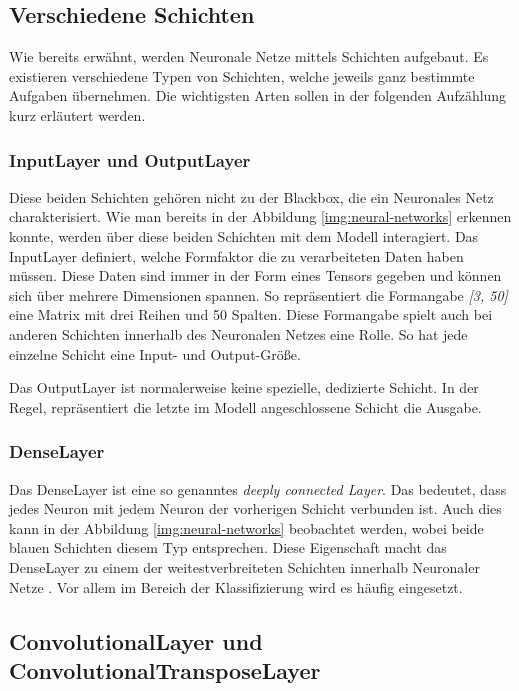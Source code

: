 \subsection{Verschiedene Schichten}
Wie bereits erwähnt, werden Neuronale Netze mittels Schichten aufgebaut.
Es existieren verschiedene Typen von Schichten, welche jeweils ganz bestimmte Aufgaben übernehmen.
Die wichtigsten Arten sollen in der folgenden Aufzählung kurz erläutert werden.

\subsubsection{InputLayer und OutputLayer}
Diese beiden Schichten gehören nicht zu der Blackbox, die ein Neuronales Netz charakterisiert.
Wie man bereits in der Abbildung \ref{img:neural-networks} erkennen konnte, werden über diese beiden Schichten mit dem Modell interagiert.
Das InputLayer definiert, welche Formfaktor die zu verarbeiteten Daten haben müssen.
Diese Daten sind immer in der Form eines Tensors gegeben und können sich über mehrere Dimensionen spannen. 
So repräsentiert die Formangabe \textit{[3, 50]} eine Matrix mit drei Reihen und 50 Spalten.
Diese Formangabe spielt auch bei anderen Schichten innerhalb des Neuronalen Netzes eine Rolle.
So hat jede einzelne Schicht eine Input- und Output-Größe.
\newline

Das OutputLayer ist normalerweise keine spezielle, dedizierte Schicht.
In der Regel, repräsentiert die letzte im Modell angeschlossene Schicht die Ausgabe.

\subsubsection{DenseLayer}
Das DenseLayer ist eine so genanntes \textit{deeply connected Layer}.
Das bedeutet, dass jedes Neuron mit jedem Neuron der vorherigen Schicht verbunden ist.
Auch dies kann in der Abbildung \ref{img:neural-networks} beobachtet werden, wobei beide blauen Schichten diesem Typ entsprechen.
Diese Eigenschaft macht das DenseLayer zu einem der weitestverbreiteten Schichten innerhalb Neuronaler Netze \cite{dense-layer}.
Vor allem im Bereich der Klassifizierung wird es häufig eingesetzt.

\subsection{ConvolutionalLayer und ConvolutionalTransposeLayer}


